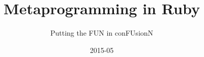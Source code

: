 \usepackage{etex}
\usepackage[english]{babel}

\usepackage[all]{xy}
\usepackage[latin1]{inputenc}

\usepackage{palatino,courier}
\usepackage{amsfonts,amssymb}
\usepackage[mathscr]{euscript}
\usepackage{stmaryrd}
\usepackage{eulervm}

\usepackage{proof}
\usepackage{amsmath}
\usepackage{xspace}

\usepackage{graphicx}
\usepackage{listings}
\usepackage{color}
\usepackage{hyperref}

\lstset{language=Ruby}
%
%
%




\title{Metaprogramming in Ruby}
\subtitle{Putting the FUN in conFUsionN}

\author[Dr. Brett~Giles]{}



\date
{2015-05}

\subject{Metaprogramming}

